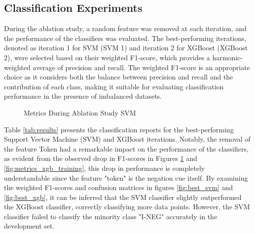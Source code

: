 \subsection{Classification Experiments}

During the ablation study, a random feature was removed at each iteration, and the performance of the classifiers was evaluated. The best-performing iterations, denoted as iteration 1 for SVM (SVM 1) and iteration 2 for XGBoost (XGBoost 2), were selected based on their weighted F1-score, which provides a harmonic-weighted average of precision and recall. The weighted F1-score is an appropriate choice as it considers both the balance between precision and recall and the contribution of each class, making it suitable for evaluating classification performance in the presence of imbalanced datasets.

\begin{figure}[!ht]
\centering
  \caption{Metrics During Ablation Study SVM}
  \label{fig:metrics_svm_training}
\end{figure}

Table \ref{tab:results} presents the classification reports for the best-performing Support Vector Machine (SVM) and XGBoost iterations. Notably, the removal of the feature Token had a remarkable impact on the performance of the classifiers, as evident from the observed drop in F1-scores in Figures \ref{fig:metrics_svm_training} and \ref{fig:metrics_xgb_training}, this drop in performance is completely understandable since the feature "token" is the negation cue itself. By examining the weighted F1-scores and confusion matrices in figures \ref{fig:best_svm} and \ref{fig:best_xgb}, it can be inferred that the SVM classifier slightly outperformed the XGBoost classifier, correctly classifying more data points. However, the SVM classifier failed to classify the minority class "I-NEG" accurately in the development set.

